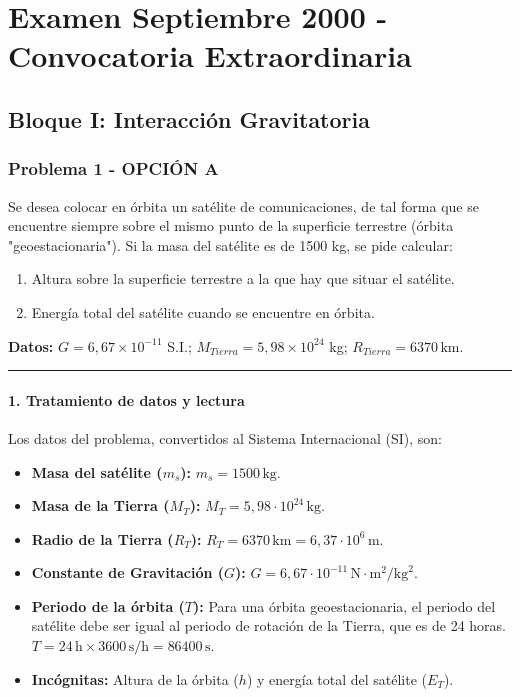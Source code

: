 \chapter{Examen Septiembre 2000 - Convocatoria Extraordinaria}
\label{chap:2000_sep_ext}

\section{Bloque I: Interacción Gravitatoria}
\label{sec:grav_2000_sep_ext}

\subsection{Problema 1 - OPCIÓN A}
\label{subsec:1A_2000_sep_ext}

\begin{cajaenunciado}
Se desea colocar en órbita un satélite de comunicaciones, de tal forma que se encuentre siempre sobre el mismo punto de la superficie terrestre (órbita "geoestacionaria"). Si la masa del satélite es de 1500 kg, se pide calcular:
\begin{enumerate}
    \item Altura sobre la superficie terrestre a la que hay que situar el satélite.
    \item Energía total del satélite cuando se encuentre en órbita.
\end{enumerate}
\textbf{Datos:} $G=6,67\times10^{-11}$ S.I.; $M_{Tierra}=5,98\times10^{24}$ kg; $R_{Tierra}=6370\,\text{km}$.
\end{cajaenunciado}
\hrule

\subsubsection*{1. Tratamiento de datos y lectura}
Los datos del problema, convertidos al Sistema Internacional (SI), son:
\begin{itemize}
    \item \textbf{Masa del satélite ($m_s$):} $m_s = 1500 \, \text{kg}$.
    \item \textbf{Masa de la Tierra ($M_T$):} $M_T = 5,98 \cdot 10^{24} \, \text{kg}$.
    \item \textbf{Radio de la Tierra ($R_T$):} $R_T = 6370 \, \text{km} = 6,37 \cdot 10^6 \, \text{m}$.
    \item \textbf{Constante de Gravitación ($G$):} $G = 6,67 \cdot 10^{-11} \, \text{N}\cdot\text{m}^2/\text{kg}^2$.
    \item \textbf{Periodo de la órbita ($T$):} Para una órbita geoestacionaria, el periodo del satélite debe ser igual al periodo de rotación de la Tierra, que es de 24 horas.
    $T = 24 \, \text{h} \times 3600 \, \text{s/h} = 86400 \, \text{s}$.
    \item \textbf{Incógnitas:} Altura de la órbita ($h$) y energía total del satélite ($E_T$).
\end{itemize}

